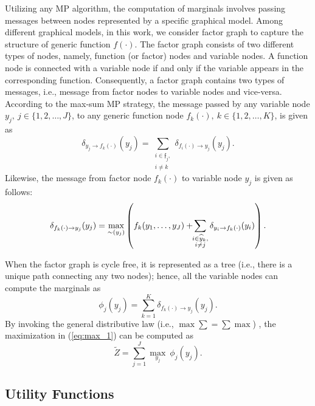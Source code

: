 \documentclass[twocolumn,10pt]{IEEEtran}
\begin{document}
Utilizing any MP algorithm, the computation of marginals involves passing messages between nodes represented by a specific graphical model. Among different graphical models, in this work, we consider factor graph \cite{bp_factor_graph} to capture the structure of generic function $f(\cdot)$. The factor graph consists of two different types of nodes, namely, function (or factor) nodes and variable nodes. A function node is connected with a variable node if and only if the variable appears in the corresponding function. Consequently, a factor graph contains two types of messages, i.e., message from factor nodes to variable nodes and vice-versa. According to the max-sum MP strategy, the message passed by any variable node $y_j, ~ j \in \lbrace 1, 2, \ldots, J \rbrace$, to any generic function node $f_k(\cdot), ~ k \in \lbrace 1, 2, \ldots, K \rbrace$, is given as
\begin{equation} \label{eq:msg_var_2_fact}
\delta_{y_j \rightarrow f_k(\cdot)}(y_j) = \sum_{\substack{i \in \mathfrak{f}_j, \\  i \neq k}} \delta_{f_i(\cdot) \rightarrow y_j} (y_j). 
\end{equation}
Likewise, the message from factor node $f_k(\cdot)$ to variable node $y_j$ is given as follows:
\begin{equation} \label{eq:msg_fact_2_var}
\delta_{f_k(\cdot) \rightarrow y_j } (y_j) = \underset{\sim (y_j)}{\operatorname{max}} \left( f_k(y_1, \ldots, y_J) + \hspace{-0.3em} \sum_{\substack{i \in \widehat{y}_k, \\ i \neq j}} \delta_{y_i \rightarrow f_k(\cdot)} (y_i) \right).
\end{equation}

When the factor graph is cycle free, it is represented as a tree (i.e., there is a unique path connecting any two nodes); hence, all the variable nodes can compute the marginals as
\begin{equation}
\phi_{j}(y_j) = \sum_{k = 1}^{K} \delta_{f_k(\cdot) \rightarrow y_j} (y_j).
\end{equation}
By invoking the general distributive law (i.e., $\max \sum = \sum \max$) \cite{mp_distributive}, the maximization in (\ref{eq:max_1}) can be computed as \begin{equation}
\tilde{Z} = \displaystyle \sum_{j=1}^{J} \underset{y_j}{\operatorname{max}} ~ \phi_{j}(y_j).
\end{equation}

\subsection{Utility Functions}
\end{document}

